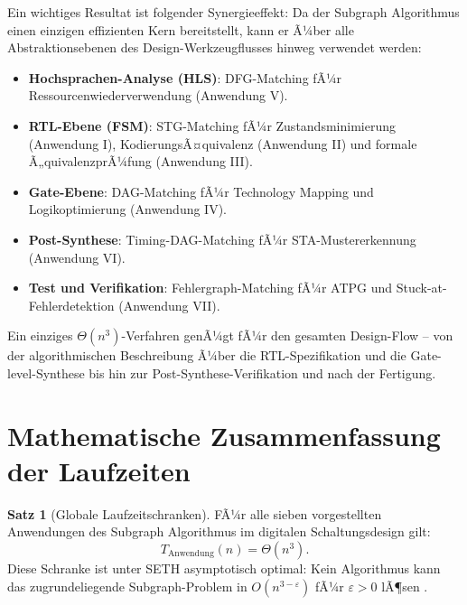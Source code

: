 ﻿\documentclass[a4paper,12pt]{article}
\theoremstyle{definition}
\newtheorem{satz}{Satz}
\begin{document}
Ein wichtiges Resultat ist folgender Synergieeffekt: Da der Subgraph Algorithmus einen
einzigen effizienten Kern bereitstellt, kann er Ã¼ber alle Abstraktionsebenen des
Design-Werkzeugflusses hinweg verwendet werden:

\begin{itemize}
  \item \textbf{Hochsprachen-Analyse (HLS)}: DFG-Matching fÃ¼r Ressourcenwiederverwendung
        (Anwendung V).
  \item \textbf{RTL-Ebene (FSM)}: STG-Matching fÃ¼r Zustandsminimierung
        (Anwendung I), KodierungsÃ¤quivalenz (Anwendung II) und formale
        Ã„quivalenzprÃ¼fung (Anwendung III).
  \item \textbf{Gate-Ebene}: DAG-Matching fÃ¼r Technology Mapping und Logikoptimierung
        (Anwendung IV).
  \item \textbf{Post-Synthese}: Timing-DAG-Matching fÃ¼r STA-Mustererkennung
        (Anwendung VI).
  \item \textbf{Test und Verifikation}: Fehlergraph-Matching fÃ¼r ATPG und
        Stuck-at-Fehlerdetek\-tion (Anwendung VII).
\end{itemize}

Ein einziges $\Theta(n^3)$-Verfahren genÃ¼gt fÃ¼r den gesamten Design-Flow --
von der algorithmischen Beschreibung Ã¼ber die RTL-Spezifikation und die
Gate-level-Synthese bis hin zur Post-Synthese-Verifikation und
nach der Fertigung.

\section{Mathematische Zusammenfassung der Laufzeiten}

\begin{satz}[Globale Laufzeitschranken]\label{satz:global}
  FÃ¼r alle sieben vorgestellten Anwendungen des Subgraph Algorithmus im digitalen
  Schaltungsdesign gilt:
  \[
    T_{\text{Anwendung}}(n) = \Theta(n^3).
  \]
  Diese Schranke ist unter SETH asymptotisch optimal: Kein Algorithmus kann das
  zugrundeliegende Subgraph-Problem in $O(n^{3-\varepsilon})$ fÃ¼r $\varepsilon > 0$ lÃ¶sen
  \cite{subgraph2026,abboud2015tight}.
\end{satz}
\end{document}
